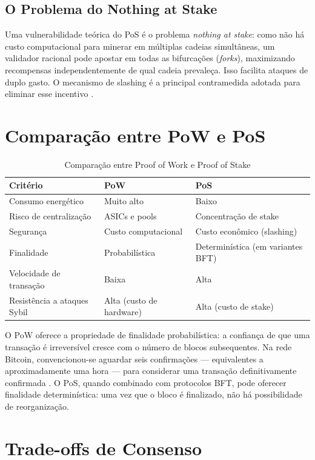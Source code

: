 \documentclass[12pt,a4paper]{report}
\begin{document}
\subsection{O Problema do Nothing at Stake}

Uma vulnerabilidade teórica do PoS é o problema \textit{nothing at stake}: como não há custo computacional para minerar em múltiplas cadeias simultâneas, um validador racional pode apostar em todas as bifurcações (\textit{forks}), maximizando recompensas independentemente de qual cadeia prevaleça. Isso facilita ataques de duplo gasto. O mecanismo de slashing é a principal contramedida adotada para eliminar esse incentivo \cite{Bashir2023}.

\section{Comparação entre PoW e PoS}

\begin{table}[h!]
\centering
\caption{Comparação entre Proof of Work e Proof of Stake}
\label{tab:pow-pos}
\begin{tabular}{lll}
\hline
\textbf{Critério} & \textbf{PoW} & \textbf{PoS} \\
\hline
Consumo energético & Muito alto & Baixo \\
Risco de centralização & ASICs e pools & Concentração de stake \\
Segurança & Custo computacional & Custo econômico (slashing) \\
Finalidade & Probabilística & Determinística (em variantes BFT) \\
Velocidade de transação & Baixa & Alta \\
Resistência a ataques Sybil & Alta (custo de hardware) & Alta (custo de stake) \\
\hline
\end{tabular}
\end{table}

O PoW oferece a propriedade de finalidade probabilística: a confiança de que uma transação é irreversível cresce com o número de blocos subsequentes. Na rede Bitcoin, convencionou-se aguardar seis confirmações --- equivalentes a aproximadamente uma hora --- para considerar uma transação definitivamente confirmada \cite{Bashir2023}. O PoS, quando combinado com protocolos BFT, pode oferecer finalidade determinística: uma vez que o bloco é finalizado, não há possibilidade de reorganização.

\section{Trade-offs de Consenso}
\end{document}
